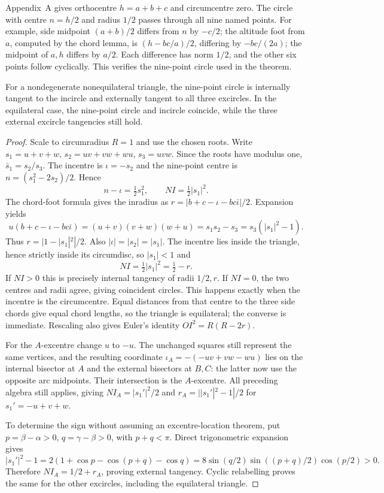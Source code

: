 Appendix~A gives orthocentre $h=a+b+c$ and circumcentre zero. The circle with centre $n=h/2$ and radius $1/2$ passes through all nine named points. For example, side midpoint $(a+b)/2$ differs from $n$ by $-c/2$; the altitude foot from $a$, computed by the chord lemma, is $(h-bc/a)/2$, differing by $-bc/(2a)$; the midpoint of $a,h$ differs by $a/2$. Each difference has norm $1/2$, and the other six points follow cyclically. This verifies the nine-point circle used in the theorem.

\begin{theorem}[Feuerbach, 1822]\label{geometry:thm:feuerbach}
For a nondegenerate nonequilateral triangle, the nine-point circle is internally tangent to the incircle and externally tangent to all three excircles. In the equilateral case, the nine-point circle and incircle coincide, while the three external excircle tangencies still hold.
\end{theorem}
\begin{proof}
Scale to circumradius $R=1$ and use the chosen roots. Write $s_1=u+v+w$, $s_2=uv+vw+wu$, $s_3=uvw$. Since the roots have modulus one, $\bar s_1=s_2/s_3$. The incentre is $\iota=-s_2$ and the nine-point centre is $n=(s_1^2-2s_2)/2$. Hence
\[
n-\iota=\tfrac12s_1^2,\qquad NI=\tfrac12|s_1|^2.
\]
The chord-foot formula gives the inradius as
$r=|b+c-\iota-bc\bar\iota|/2$. Expansion yields
\[
u(b+c-\iota-bc\bar\iota)
=(u+v)(v+w)(w+u)=s_1s_2-s_3
=s_3(|s_1|^2-1).
\]
Thus $r=|1-|s_1|^2|/2$. Also $|\iota|=|s_2|=|s_1|$. The incentre lies inside the triangle, hence strictly inside its circumdisc, so $|s_1|<1$ and
\[
NI=\tfrac12|s_1|^2=\tfrac12-r.
\]
If $NI>0$ this is precisely internal tangency of radii $1/2,r$. If $NI=0$, the two centres and radii agree, giving coincident circles. This happens exactly when the incentre is the circumcentre. Equal distances from that centre to the three side chords give equal chord lengths, so the triangle is equilateral; the converse is immediate. Rescaling also gives Euler's identity $OI^2=R(R-2r)$.

For the $A$-excentre change $u$ to $-u$. The unchanged squares still represent the same vertices, and the resulting coordinate $\iota_A=-(-uv+vw-wu)$ lies on the internal bisector at $A$ and the external bisectors at $B,C$: the latter now use the opposite arc midpoints. Their intersection is the $A$-excentre. All preceding algebra still applies, giving $NI_A=|s_1'|^2/2$ and $r_A=||s_1'|^2-1|/2$ for $s_1'=-u+v+w$.

To determine the sign without assuming an excentre-location theorem, put $p=\beta-\alpha>0$, $q=\gamma-\beta>0$, with $p+q<\pi$. Direct trigonometric expansion gives
\[
|s_1'|^2-1
=2(1+\cos p-\cos(p+q)-\cos q)
=8\sin(q/2)\sin((p+q)/2)\cos(p/2)>0.
\]
Therefore $NI_A=1/2+r_A$, proving external tangency. Cyclic relabelling proves the same for the other excircles, including the equilateral triangle.
\end{proof}

